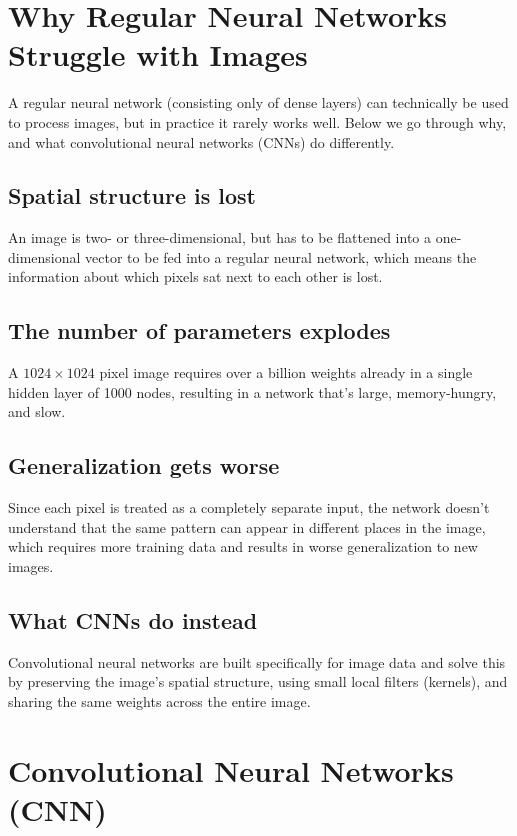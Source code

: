 
\section{Why Regular Neural Networks Struggle with Images}
\label{c6:sec:images}\label{c6:app:a}
A regular neural network (consisting only of dense layers) can technically be used to process
images, but in practice it rarely works well. Below we go through why, and what convolutional
neural networks (CNNs) do differently.

\subsection{Spatial structure is lost}
An image is two- or three-dimensional, but has to be flattened into a one-dimensional vector to be
fed into a regular neural network, which means the information about which pixels sat next to each
other is lost.

\subsection{The number of parameters explodes}
A $1024 \times 1024$ pixel image requires over a billion weights already in a single hidden layer
of 1000 nodes, resulting in a network that's large, memory-hungry, and slow.

\subsection{Generalization gets worse}
Since each pixel is treated as a completely separate input, the network doesn't understand that the
same pattern can appear in different places in the image, which requires more training data and
results in worse generalization to new images.

\subsection{What CNNs do instead}
Convolutional neural networks are built specifically for image data and solve this by preserving
the image's spatial structure, using small local filters (kernels), and sharing the same weights
across the entire image.

\section{Convolutional Neural Networks (CNN)}
\label{c6:sec:cnn}

